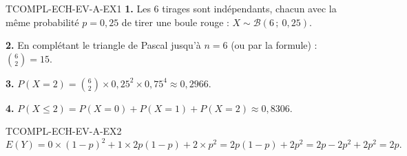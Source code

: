 \begin{corrige}{TCOMPL-ECH-EV-A-EX1}
\textbf{1.} Les $6$ tirages sont indépendants, chacun avec la même probabilité $p=0{,}25$ de tirer une boule rouge : $X\sim\mathcal{B}(6\,;\ 0{,}25)$.

\textbf{2.} En complétant le triangle de Pascal jusqu'à $n=6$ (ou par la formule) : $\binom{6}{2}=15$.

\textbf{3.} $P(X=2) = \binom{6}{2}\times0{,}25^2\times0{,}75^4 \approx 0{,}2966$.

\textbf{4.} $P(X\leq2) = P(X=0)+P(X=1)+P(X=2) \approx 0{,}8306$.
\end{corrige}

\begin{corrige}{TCOMPL-ECH-EV-A-EX2}
\[
  E(Y) = 0\times(1-p)^2 + 1\times2p(1-p) + 2\times p^2 = 2p(1-p)+2p^2 = 2p-2p^2+2p^2 = 2p.
\]
\end{corrige}
